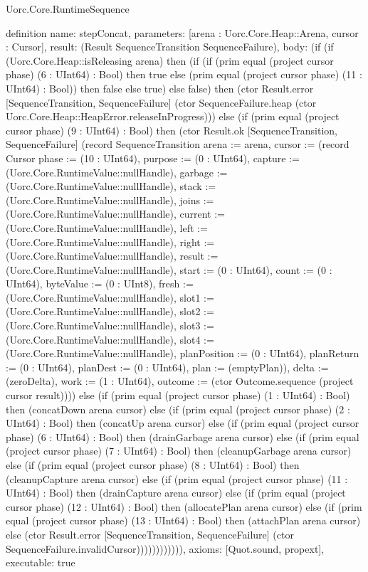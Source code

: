 \begin{lexlean}{Uorc.Core.RuntimeSequence}
\begin{semanticmodule}
definition{
  name: stepConcat,
  parameters: [arena : Uorc.Core.Heap::Arena, cursor : Cursor],
  result: (Result SequenceTransition SequenceFailure),
  body: (if (if (Uorc.Core.Heap::isReleasing arena) then (if (if (prim equal (project cursor phase) (6 : UInt64) : Bool) then true else (prim equal (project cursor phase) (11 : UInt64) : Bool)) then false else true) else false) then (ctor Result.error [SequenceTransition, SequenceFailure] (ctor SequenceFailure.heap (ctor Uorc.Core.Heap::HeapError.releaseInProgress))) else (if (prim equal (project cursor phase) (9 : UInt64) : Bool) then (ctor Result.ok [SequenceTransition, SequenceFailure] (record SequenceTransition {arena := arena, cursor := (record Cursor {phase := (10 : UInt64), purpose := (0 : UInt64), capture := (Uorc.Core.RuntimeValue::nullHandle), garbage := (Uorc.Core.RuntimeValue::nullHandle), stack := (Uorc.Core.RuntimeValue::nullHandle), joins := (Uorc.Core.RuntimeValue::nullHandle), current := (Uorc.Core.RuntimeValue::nullHandle), left := (Uorc.Core.RuntimeValue::nullHandle), right := (Uorc.Core.RuntimeValue::nullHandle), result := (Uorc.Core.RuntimeValue::nullHandle), start := (0 : UInt64), count := (0 : UInt64), byteValue := (0 : UInt8), fresh := (Uorc.Core.RuntimeValue::nullHandle), slot1 := (Uorc.Core.RuntimeValue::nullHandle), slot2 := (Uorc.Core.RuntimeValue::nullHandle), slot3 := (Uorc.Core.RuntimeValue::nullHandle), slot4 := (Uorc.Core.RuntimeValue::nullHandle), planPosition := (0 : UInt64), planReturn := (0 : UInt64), planDest := (0 : UInt64), plan := (emptyPlan)}), delta := (zeroDelta), work := (1 : UInt64), outcome := (ctor Outcome.sequence (project cursor result))})) else (if (prim equal (project cursor phase) (1 : UInt64) : Bool) then (concatDown arena cursor) else (if (prim equal (project cursor phase) (2 : UInt64) : Bool) then (concatUp arena cursor) else (if (prim equal (project cursor phase) (6 : UInt64) : Bool) then (drainGarbage arena cursor) else (if (prim equal (project cursor phase) (7 : UInt64) : Bool) then (cleanupGarbage arena cursor) else (if (prim equal (project cursor phase) (8 : UInt64) : Bool) then (cleanupCapture arena cursor) else (if (prim equal (project cursor phase) (11 : UInt64) : Bool) then (drainCapture arena cursor) else (if (prim equal (project cursor phase) (12 : UInt64) : Bool) then (allocatePlan arena cursor) else (if (prim equal (project cursor phase) (13 : UInt64) : Bool) then (attachPlan arena cursor) else (ctor Result.error [SequenceTransition, SequenceFailure] (ctor SequenceFailure.invalidCursor)))))))))))),
  axioms: [Quot.sound, propext],
  executable: true
}


\end{semanticmodule}
\end{lexlean}
